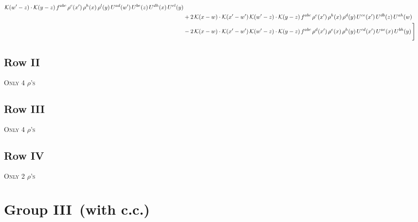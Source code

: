 \documentclass[9pt]{article}
\numberwithin{equation}{section}
\begin{document}
\begin{align}
\mathcal{K}(w'-z)\cdot \mathcal{K}(y-z)\, f^{abc}\,\rho^{c}(x')\,\rho^{h}(x)\,\rho^{l}(y)\,U^{ad}(w')\,U^{be}(z)\,U^{dh}(x)\,U^{el}(y)\notag \\ & +2\, \mathcal{K}(x-w)\cdot \mathcal{K}(x'-w')\, \mathcal{K}(w'-z)\cdot \mathcal{K}(y-z)\, f^{abc}\,\rho^{e}(x')\,\rho^{h}(x)\,\rho^{d}(y)\,U^{ce}(x')\,U^{db}(z)\,U^{ah}(w)\notag \\ &  -2\, \mathcal{K}(x-w)\cdot \mathcal{K}(x'-w')\, \mathcal{K}(w'-z)\cdot \mathcal{K}(y-z)\, f^{abc}\,\rho^{d}(x')\,\rho^{e}(x)\,\rho^{h}(y)\,U^{cd}(x')\,U^{ae}(x)\,U^{bh}(y)\,\Bigg]
\end{align}
\subsection{Row II}
\textsc{Only 4 $\rho$'s}
\subsection{Row III}
\textsc{Only 4 $\rho$'s}
\subsection{Row IV}
\textsc{Only 2 $\rho$'s}
\section{Group III\, (with c.c.)}
\end{document}
